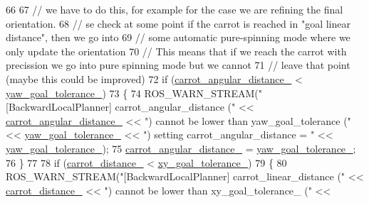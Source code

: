 \begin{DoxyCode}
66 
67             \textcolor{comment}{// we have to do this, for example for the case we are refining the final orientation.}
68             \textcolor{comment}{// se check at some point if the carrot is reached in "goal linear distance", then we go into}
69             \textcolor{comment}{// some automatic pure-spinning mode where we only update the orientation}
70             \textcolor{comment}{// This means that if we reach the carrot with precission we go into pure spinning mode but we
       cannot}
71             \textcolor{comment}{// leave that point (maybe this could be improved)}
72             \textcolor{keywordflow}{if} (\hyperlink{classcl__move__base__z_1_1backward__local__planner_1_1BackwardLocalPlanner_a63e30befa09c4a67cf55086923b760c7}{carrot\_angular\_distance\_} < 
      \hyperlink{classcl__move__base__z_1_1backward__local__planner_1_1BackwardLocalPlanner_a9c5104d328041fcde5a3c02664abad48}{yaw\_goal\_tolerance\_})
73             \{
74                 ROS\_WARN\_STREAM(\textcolor{stringliteral}{"[BackwardLocalPlanner] carrot\_angular\_distance ("} << 
      \hyperlink{classcl__move__base__z_1_1backward__local__planner_1_1BackwardLocalPlanner_a63e30befa09c4a67cf55086923b760c7}{carrot\_angular\_distance\_} << \textcolor{stringliteral}{") cannot be lower than yaw\_goal\_tolerance ("} << 
      \hyperlink{classcl__move__base__z_1_1backward__local__planner_1_1BackwardLocalPlanner_a9c5104d328041fcde5a3c02664abad48}{yaw\_goal\_tolerance\_} << \textcolor{stringliteral}{") setting carrot\_angular\_distance = "} << 
      \hyperlink{classcl__move__base__z_1_1backward__local__planner_1_1BackwardLocalPlanner_a9c5104d328041fcde5a3c02664abad48}{yaw\_goal\_tolerance\_});
75                 \hyperlink{classcl__move__base__z_1_1backward__local__planner_1_1BackwardLocalPlanner_a63e30befa09c4a67cf55086923b760c7}{carrot\_angular\_distance\_} = 
      \hyperlink{classcl__move__base__z_1_1backward__local__planner_1_1BackwardLocalPlanner_a9c5104d328041fcde5a3c02664abad48}{yaw\_goal\_tolerance\_};
76             \}
77 
78             \textcolor{keywordflow}{if} (\hyperlink{classcl__move__base__z_1_1backward__local__planner_1_1BackwardLocalPlanner_a0bbb80ce5bae865c4322869422803296}{carrot\_distance\_} < \hyperlink{classcl__move__base__z_1_1backward__local__planner_1_1BackwardLocalPlanner_aa4ec2c87947a3c08f8278eff052e7c8c}{xy\_goal\_tolerance\_})
79             \{
80                 ROS\_WARN\_STREAM(\textcolor{stringliteral}{"[BackwardLocalPlanner] carrot\_linear\_distance ("} << 
      \hyperlink{classcl__move__base__z_1_1backward__local__planner_1_1BackwardLocalPlanner_a0bbb80ce5bae865c4322869422803296}{carrot\_distance\_} << \textcolor{stringliteral}{") cannot be lower than xy\_goal\_tolerance\_ ("} << 

\end{DoxyCode}
